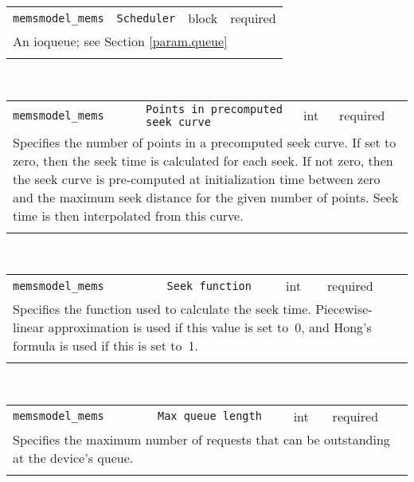\noindent 
\begin{tabular}{|p{\lpmodwidth}|p{\lpnamewidth}|p{0.5in}|p{0.5in}|}
\cline{1-4}
\texttt{memsmodel\_mems} & \texttt{Scheduler} & block & required \\ 
\cline{1-4}
\multicolumn{4}{|p{6in}|}{
An ioqueue; see Section \ref{param.queue}
}\\ 
\cline{1-4}
\multicolumn{4}{p{5in}}{}\\
\end{tabular}\\ 
\noindent 
\begin{tabular}{|p{\lpmodwidth}|p{\lpnamewidth}|p{0.5in}|p{0.5in}|}
\cline{1-4}
\texttt{memsmodel\_mems} & \texttt{Points in precomputed seek curve} & int & required \\ 
\cline{1-4}
\multicolumn{4}{|p{6in}|}{
Specifies the number of points in a precomputed seek curve. If set to
zero, then the seek time is calculated for each seek. If not zero,
then the seek curve is pre-computed at initialization time between
zero and the maximum seek distance for the given number of points.
Seek time is then interpolated from this curve.
}\\ 
\cline{1-4}
\multicolumn{4}{p{5in}}{}\\
\end{tabular}\\ 
\noindent 
\begin{tabular}{|p{\lpmodwidth}|p{\lpnamewidth}|p{0.5in}|p{0.5in}|}
\cline{1-4}
\texttt{memsmodel\_mems} & \texttt{Seek function} & int & required \\ 
\cline{1-4}
\multicolumn{4}{|p{6in}|}{
Specifies the function used to calculate the seek time.
Piecewise-linear approximation is used if this value is set to~0, and
Hong's formula is used if this is set to~1.
}\\ 
\cline{1-4}
\multicolumn{4}{p{5in}}{}\\
\end{tabular}\\ 
\noindent 
\begin{tabular}{|p{\lpmodwidth}|p{\lpnamewidth}|p{0.5in}|p{0.5in}|}
\cline{1-4}
\texttt{memsmodel\_mems} & \texttt{Max queue length} & int & required \\ 
\cline{1-4}
\multicolumn{4}{|p{6in}|}{
Specifies the maximum number of requests that can be outstanding at
the device's queue.
}\\ 
\cline{1-4}
\multicolumn{4}{p{5in}}{}\\
\end{tabular}\\ 
